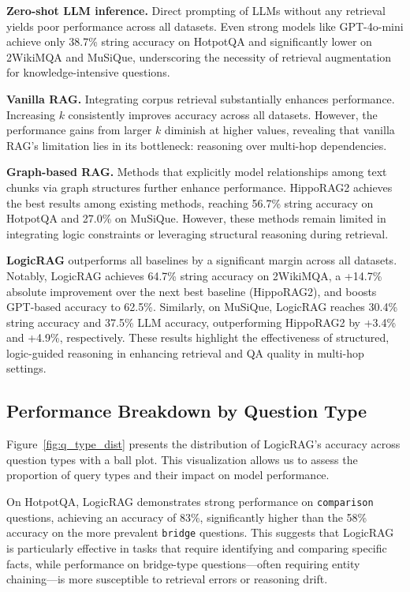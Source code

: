 \documentclass[letterpaper]{article} %
\begin{document}
\textbf{Zero-shot LLM inference.} Direct prompting of LLMs without any retrieval yields poor performance across all datasets. Even strong models like GPT-4o-mini achieve only 38.7\% string accuracy on HotpotQA and significantly lower on 2WikiMQA and MuSiQue, underscoring the necessity of retrieval augmentation for knowledge-intensive questions.

\textbf{Vanilla RAG.} Integrating corpus retrieval substantially enhances performance. Increasing $k$ consistently improves accuracy across all datasets. However, the performance gains from larger $k$ diminish at higher values, revealing that vanilla RAG's limitation lies in its bottleneck: reasoning over multi-hop dependencies.

\textbf{Graph-based RAG.} Methods that explicitly model relationships among text chunks via graph structures further enhance performance. HippoRAG2 achieves the best results among existing methods, reaching 56.7\% string accuracy on HotpotQA and 27.0\% on MuSiQue. However, these methods remain limited in integrating logic constraints or leveraging structural reasoning during retrieval.

\textbf{LogicRAG} outperforms all baselines by a significant margin across all datasets. Notably, LogicRAG achieves 64.7\% string accuracy on 2WikiMQA, a +14.7\% absolute improvement over the next best baseline (HippoRAG2), and boosts GPT-based accuracy to 62.5\%. Similarly, on MuSiQue, LogicRAG reaches 30.4\% string accuracy and 37.5\% LLM accuracy, outperforming HippoRAG2 by +3.4\% and +4.9\%, respectively. These results highlight the effectiveness of structured, logic-guided reasoning in enhancing retrieval and QA quality in multi-hop settings.


\subsection{Performance Breakdown by Question Type}

Figure~\ref{fig:q_type_dist} presents the distribution of LogicRAG’s accuracy across question types with a ball plot. This visualization allows us to assess the proportion of query types and their impact on model performance.

On HotpotQA, LogicRAG demonstrates strong performance on \texttt{comparison} questions, achieving an accuracy of 83\%, significantly higher than the 58\% accuracy on the more prevalent \texttt{bridge} questions. This suggests that LogicRAG is particularly effective in tasks that require identifying and comparing specific facts, while performance on bridge-type questions—often requiring entity chaining—is more susceptible to retrieval errors or reasoning drift.
\end{document}
